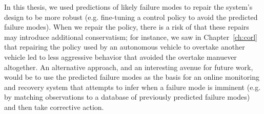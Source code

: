 In this thesis, we used predictions of likely failure modes to repair the system's design to be more robust (e.g. fine-tuning a control policy to avoid the predicted failure modes). When we repair the policy, there is a risk of that these repairs may introduce additional conservatism; for instance, we saw in Chapter~\ref{ch:corl} that repairing the policy used by an autonomous vehicle to overtake another vehicle led to less aggressive behavior that avoided the overtake manuever altogether. An alternative approach, and an interesting avenue for future work, would be to use the predicted failure modes as the basis for an online monitoring and recovery system that attempts to infer when a failure mode is imminent (e.g. by matching observations to a database of previously predicted failure modes) and then take corrective action.
